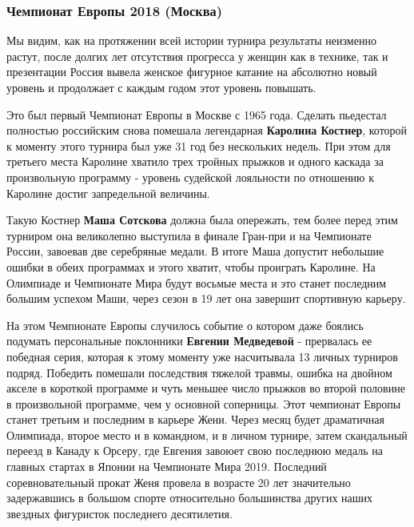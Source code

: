  
 
 
 
 
\subsubsection{Чемпионат Европы 2018 (Москва)}
\label{sec:04_01_2022.yz.figurka_ot_maksima_jagudina.1.chempionaty_evropy.8.moskva_2018}

Мы видим, как на протяжении всей истории турнира результаты неизменно растут,
после долгих лет отсутствия прогресса у женщин как в технике, так и презентации
Россия вывела женское фигурное катание на абсолютно новый уровень и продолжает
с каждым годом этот уровень повышать. 


Это был первый Чемпионат Европы в Москве с 1965 года. Сделать пьедестал
полностью российским снова помешала легендарная \textbf{Каролина Костнер}, которой к
моменту этого турнира был уже 31 год без нескольких недель. При этом для
третьего места Каролине хватило трех тройных прыжков и одного каскада за
произвольную программу - уровень судейской лояльности по отношению к Каролине
достиг запредельной величины.


Такую Костнер \textbf{Маша Сотскова} должна была опережать, тем более перед этим
турниром она великолепно выступила в финале Гран-при и на Чемпионате России,
завоевав две серебряные медали. В итоге Маша допустит небольшие ошибки в обеих
программах и этого хватит, чтобы проиграть Каролине. На Олимпиаде и Чемпионате
Мира будут восьмые места и это станет последним большим успехом Маши, через
сезон в 19 лет она завершит спортивную карьеру.

На этом Чемпионате Европы случилось событие о котором даже боялись подумать
персональные поклонники \textbf{Евгении Медведевой} - прервалась ее победная серия,
которая к этому моменту уже насчитывала 13 личных турниров подряд. Победить
помешали последствия тяжелой травмы, ошибка на двойном акселе в короткой
программе и чуть меньшее число прыжков во второй половине в произвольной
программе, чем у основной соперницы. Этот чемпионат Европы станет третьим и
последним в карьере Жени. Через месяц будет драматичная Олимпиада, второе место
и в командном, и в личном турнире, затем скандальный переезд в Канаду к Орсеру,
где Евгения завоюет свою последнюю медаль на главных стартах в Японии на
Чемпионате Мира 2019. Последний соревновательный прокат Женя провела в возрасте
20 лет значительно задержавшись в большом спорте относительно большинства
других наших звездных фигуристок последнего десятилетия.

